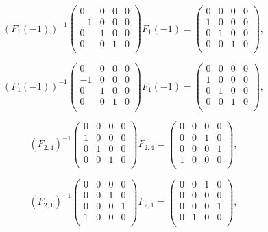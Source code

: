 \documentclass[color=black,device=normal,lang=cn,mode=geye]{elegantnote}
\begin{document}
\begin{solution}
    \[(F_1(-1))^{-1}\begin{pmatrix}
        0 & 0 & 0 & 0 \\
        -1 & 0 & 0 & 0 \\
        0 & 1 & 0 & 0 \\
        0 & 0 & 1 & 0 \\
    \end{pmatrix}F_1(-1)=\begin{pmatrix}
        0 & 0 & 0 & 0 \\
        1 & 0 & 0 & 0 \\
        0 & 1 & 0 & 0 \\
        0 & 0 & 1 & 0 \\
    \end{pmatrix},\]

    \[(F_1(-1))^{-1}\begin{pmatrix}
        0 & 0 & 0 & 0 \\
        -1 & 0 & 0 & 0 \\
        0 & 1 & 0 & 0 \\
        0 & 0 & 1 & 0 \\
    \end{pmatrix}F_1(-1)=\begin{pmatrix}
        0 & 0 & 0 & 0 \\
        1 & 0 & 0 & 0 \\
        0 & 1 & 0 & 0 \\
        0 & 0 & 1 & 0 \\
    \end{pmatrix},\]

    \[(F_{2,4})^{-1}\begin{pmatrix}
        0 & 0 & 0 & 0 \\
        1 & 0 & 0 & 0 \\
        0 & 1 & 0 & 0 \\
        0 & 0 & 1 & 0 \\
    \end{pmatrix}F_{2,4}=\begin{pmatrix}
        0 & 0 & 0 & 0 \\
        0 & 0 & 1 & 0 \\
        0 & 0 & 0 & 1 \\
        1 & 0 & 0 & 0 \\
    \end{pmatrix},\]

    \[(F_{2,1})^{-1}\begin{pmatrix}
        0 & 0 & 0 & 0 \\
        0 & 0 & 1 & 0 \\
        0 & 0 & 0 & 1 \\
        1 & 0 & 0 & 0 \\
    \end{pmatrix}F_{2,1}=\begin{pmatrix}
        0 & 0 & 1 & 0 \\
        0 & 0 & 0 & 0 \\
        0 & 0 & 0 & 1 \\
        0 & 1 & 0 & 0 \\
    \end{pmatrix},\]


\end{solution}
\end{document}
